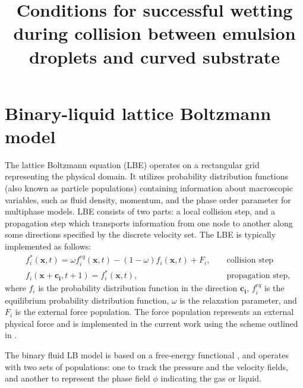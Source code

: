 \documentclass{article}
\title{Conditions for successful wetting during collision between emulsion droplets and curved substrate}
\begin{document}
\maketitle

\section{Binary-liquid lattice Boltzmann model}
The lattice Boltzmann equation (LBE) operates on a rectangular grid representing the
physical domain. It utilizes
probability distribution functions (also known as particle populations)
containing information about
macroscopic variables, such as fluid density, momentum, and the phase order parameter for multiphase models. LBE consists of
two parts: a local collision step, and a propagation step which transports
information from one node to another along some 
directions specified by the discrete velocity set.
The LBE is typically implemented as follows:
\begin{equation}
\label{standard:implementation}
\begin{aligned}
&f_i^{*}(\bm{x},t)=\omega f_i^{eq}(\bm{x},t)-(1-\omega) f_i(\bm{x},t) +
F_i,&&\text{ collision step}\\
&f_i(\bm{x}+\bm{c_i},t+1)=f_i^{*}(\bm{x},t),&&\text{ propagation step}, 
\end{aligned}
\end{equation}
where $f_i$ is the probability distribution function in the direction $\bm{c_i}$,
 $f_i^{eq}$ is the equilibrium probability distribution function, $\omega$ is the
relaxation parameter, and $F_i$ is the external force population. The force population
represents an external physical force and is implemented in the current work using the scheme
outlined in \citet{guo}.

The binary fluid LB model is
based on a free-energy functional \cite{swift,landau}, and operates with two
sets of populations: one to track the pressure and the velocity fields, and another to represent the
phase field $\phi$ indicating the gas or liquid.
\end{document}

